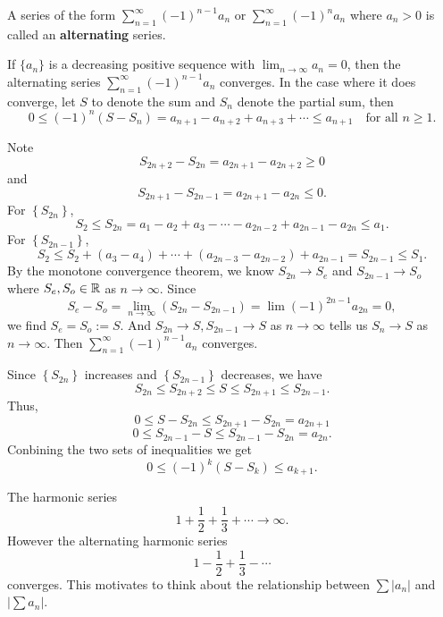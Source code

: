     \begin{definitionenv}
        A series of the form $\displaystyle \sum_{n=1}^\infty (-1)^{n-1} a_n$ or $\displaystyle \sum_{n=1}^\infty (-1)^{n} a_n$ where $a_n > 0$ is called an \textbf{alternating} series.
    \end{definitionenv}
    \begin{theoremenv}
        If $\{a_n\}$ is a decreasing positive sequence with $\displaystyle \lim_{n\to \infty} a_n = 0$, then the alternating series $\displaystyle \sum_{n=1}^\infty (-1)^{n-1} a_n$ converges. In the case where it does converge, let $S$ to denote the sum and $S_n$ denote the partial sum, then
        \[
        0 \le (-1)^n (S-S_n) = a_{n+1} - a_{n+2} + a_{n+3} + \cdots \le a_{n+1} \quad \text{for all } n\ge 1.
        \] 
        
    \end{theoremenv}
    \begin{proofenv}
        Note $$S_{2n+2} - S_{2n} = a_{2n+1} - a_{2n+2} \ge 0$$
        and $$ S_{2n+1} - S_{2n-1} = a_{2n+1} - a_{2n} \le 0.$$
        For $\left\{ S_{2n} \right\}$,
        \[
        S_2 \le S_{2n} = a_1 - a_2 + a_3 - \cdots - a_{2n-2} + a_{2n-1} - a_{2n} \le a_1.
        \]
        For $\left\{ S_{2n-1} \right\}$,
        \[
        S_2 \le S_2 + (a_3 - a_4) + \cdots+ (a_{2n-3} - a_{2n-2}) + a_{2n-1} = S_{2n-1} \le S_1.
        \]
        By the monotone convergence theorem, we know $S_{2n} \to S_e$ and $S_{2n-1} \to S_o$ where $S_e, S_o\in \mathbb{R}$ as $n\to \infty$. Since
        \[
        S_e -  S_o = \lim_{n\to \infty} (S_{2n} - S_{2n-1}) = \lim (-1)^{2n-1} a_{2n} = 0,
        \]
        we find $S_e = S_o := S$. And $S_{2n} \to S, S_{2n-1} \to S$ as $n\to \infty$ tells us $S_n\to S$ as $n\to \infty$. Then $\displaystyle \sum_{n=1}^\infty (-1)^{n-1} a_n$ converges.

        Since $\left\{ S_{2n} \right\}$ increases and $\left\{ S_{2n-1} \right\}$ decreases, we have
        \[
        S_{2n} \le S_{2n+2} \le S \le S_{2n+1} \le S_{2n-1}.
        \]
        Thus,
        \[
        0 \le S-S_{2n} \le S_{2n+1} -S_{2n} = a_{2n+1}
        \]
        \[
        0 \le S_{2n-1} - S \le S_{2n-1} - S_{2n} = a_{2n}.
        \]
        Conbining the two sets of inequalities we get
        $$ 0 \le (-1)^k (S-S_k) \le a_{k+1}.$$
    \end{proofenv}
    \begin{exampleenv}\label{ex:alternating-harmonic-series}
        The harmonic series
        $$ 1+\frac12 +\frac13 + \cdots \to \infty.$$
        However the alternating harmonic series
        $$ 1-\frac12+\frac13-\cdots $$ converges. This motivates to think about the relationship between $\sum |a_n|$ and $\big|\sum a_n\big|$.
    \end{exampleenv}
